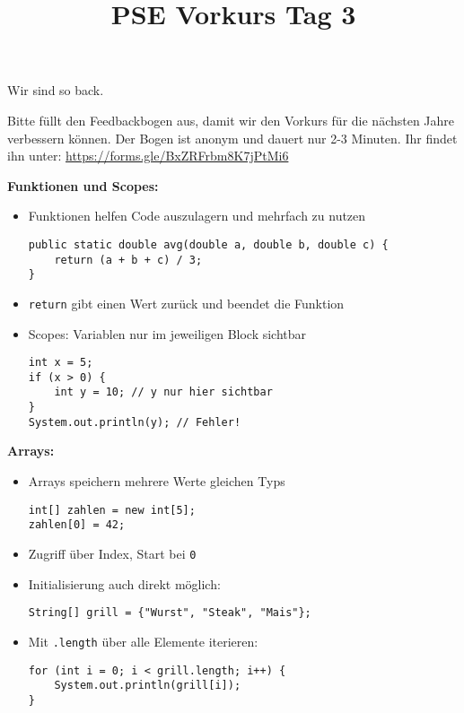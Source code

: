 \documentclass{../../sheet}
\title{PSE Vorkurs Tag 3}
\begin{document}
\maketitle
Wir sind so back.

Bitte füllt den Feedbackbogen aus, damit wir den Vorkurs für die nächsten Jahre verbessern können. Der Bogen ist anonym und dauert nur 2-3 Minuten. \newline Ihr findet ihn unter: \url{https://forms.gle/BxZRFrbm8K7jPtMi6}

\textbf{Funktionen und Scopes:}
\begin{itemize}
    \item Funktionen helfen Code auszulagern und mehrfach zu nutzen
          \begin{verbatim}
public static double avg(double a, double b, double c) {
    return (a + b + c) / 3;
}
          \end{verbatim}
    \item \texttt{return} gibt einen Wert zurück und beendet die Funktion
    \item Scopes: Variablen nur im jeweiligen Block sichtbar
          \begin{verbatim}
int x = 5;
if (x > 0) {
    int y = 10; // y nur hier sichtbar
}
System.out.println(y); // Fehler!
          \end{verbatim}
\end{itemize}

\textbf{Arrays:}

\begin{itemize}
    \item Arrays speichern mehrere Werte gleichen Typs
          \begin{verbatim}
int[] zahlen = new int[5];
zahlen[0] = 42;
          \end{verbatim}
    \item Zugriff über Index, Start bei \texttt{0}
    \item Initialisierung auch direkt möglich:
          \begin{verbatim}
String[] grill = {"Wurst", "Steak", "Mais"};
          \end{verbatim}
    \item Mit \texttt{.length} über alle Elemente iterieren:
          \begin{verbatim}
for (int i = 0; i < grill.length; i++) {
    System.out.println(grill[i]);
}
          \end{verbatim}
\end{itemize}
\end{document}
